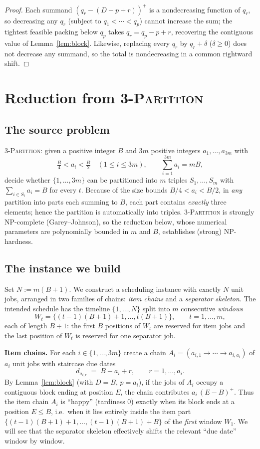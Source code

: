 \documentclass{amsart}
\theoremstyle{definition}
\theoremstyle{remark}
\begin{document}
\begin{proof}
Each summand $(q_r-(D-p+r))^{+}$ is a nondecreasing function of $q_r$, so decreasing any
$q_r$ (subject to $q_1<\cdots<q_p$) cannot increase the sum; the tightest feasible packing
below $q_p$ takes $q_r=q_p-p+r$, recovering the contiguous value of Lemma~\ref{lem:block}.
Likewise, replacing every $q_r$ by $q_r+\delta$ ($\delta\ge0$) does not decrease any
summand, so the total is nondecreasing in a common rightward shift.
\end{proof}

\section{Reduction from \textsc{3-Partition}}\label{sec:reduction}

\subsection*{The source problem}
\textsc{3-Partition}: given a positive integer $B$ and $3m$ positive integers
$a_1,\dots,a_{3m}$ with
\[
   \tfrac{B}{4}<a_i<\tfrac{B}{2}\quad(1\le i\le 3m),
   \qquad \sum_{i=1}^{3m}a_i=mB,
\]
decide whether $\{1,\dots,3m\}$ can be partitioned into $m$ triples
$S_1,\dots,S_m$ with $\sum_{i\in S_t}a_i=B$ for every $t$. Because of the size bounds
$B/4<a_i<B/2$, in \emph{any} partition into parts each summing to $B$, each part contains
\emph{exactly} three elements; hence the partition is automatically into triples.
\textsc{3-Partition} is strongly NP-complete (Garey--Johnson), so the reduction below,
whose numerical parameters are polynomially bounded in $m$ and $B$, establishes (strong)
NP-hardness.

\subsection*{The instance we build}
Set $N:=m(B+1)$. We construct a scheduling instance with exactly $N$ unit jobs, arranged
in two families of chains: \emph{item chains} and a \emph{separator skeleton}. The
intended schedule has the timeline $\{1,\dots,N\}$ split into $m$ consecutive
\emph{windows}
\[
   W_t=\bigl\{(t-1)(B+1)+1,\dots,t(B+1)\bigr\},\qquad t=1,\dots,m,
\]
each of length $B+1$: the first $B$ positions of $W_t$ are reserved for item jobs and the
last position of $W_t$ is reserved for one separator job.

\medskip
\noindent\textbf{Item chains.} For each $i\in\{1,\dots,3m\}$ create a chain
$A_i=(a_{i,1}\to\cdots\to a_{i,a_i})$ of $a_i$ unit jobs with staircase due dates
\[
   d_{a_{i,r}} \;=\; B-a_i+r ,\qquad r=1,\dots,a_i .
\]
By Lemma~\ref{lem:block} (with $D=B$, $p=a_i$), if the jobs of $A_i$ occupy a contiguous
block ending at position $E$, the chain contributes $a_i\,(E-B)^{+}$. Thus the item chain
$A_i$ is ``happy'' (tardiness $0$) exactly when its block ends at a position $E\le B$,
i.e.\ when it lies entirely inside the item part $\{(t-1)(B+1)+1,\dots,(t-1)(B+1)+B\}$ of
the \emph{first} window $W_1$. We will see that the separator skeleton effectively shifts
the relevant ``due date'' window by window.
\end{document}

